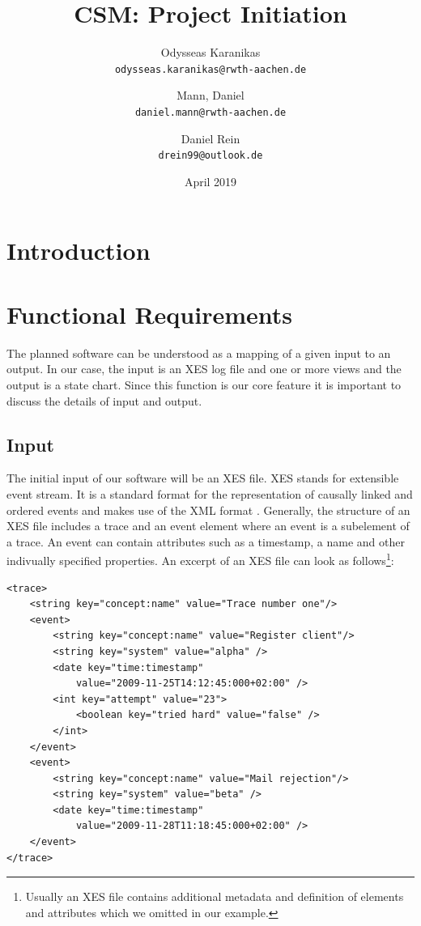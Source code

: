 \documentclass[12pt]{extarticle}
\title{CSM: Project Initiation}
\author{
Odysseas Karanikas\\
\texttt{odysseas.karanikas@rwth-aachen.de}
\and
Mann, Daniel\\
\texttt{daniel.mann@rwth-aachen.de}
\and
Daniel Rein\\
\texttt{drein99@outlook.de}
}
\date{April 2019}
\begin{document}
\maketitle

\section{Introduction}

\section{Functional Requirements}

The planned software can be understood as a mapping of a given input to an output. In our case, the input is an XES log file and one or more views and the output is a state chart. Since this function is our core feature it is important to discuss the details of input and output.

\subsection{Input}

The initial input of our software will be an XES file. XES stands for extensible event stream. It is a standard format for the representation of causally linked and ordered events and makes use of the XML format \cite{xes}. Generally, the structure of an XES file includes a trace and an event element where an event is a subelement of a trace. An event can contain attributes such as a timestamp, a name and other indivually specified properties. An excerpt of an XES file can look as follows\footnote{Usually an XES file contains additional metadata and definition of elements and attributes which we omitted in our example.}:

\begin{lstlisting}
<trace>
    <string key="concept:name" value="Trace number one"/>
    <event>
        <string key="concept:name" value="Register client"/>
        <string key="system" value="alpha" />
        <date key="time:timestamp" 
            value="2009-11-25T14:12:45:000+02:00" />
        <int key="attempt" value="23">
            <boolean key="tried hard" value="false" />
        </int>
    </event>
    <event>
        <string key="concept:name" value="Mail rejection"/>
        <string key="system" value="beta" />
        <date key="time:timestamp" 
            value="2009-11-28T11:18:45:000+02:00" />
    </event>
</trace>
\end{lstlisting}
\end{document}
